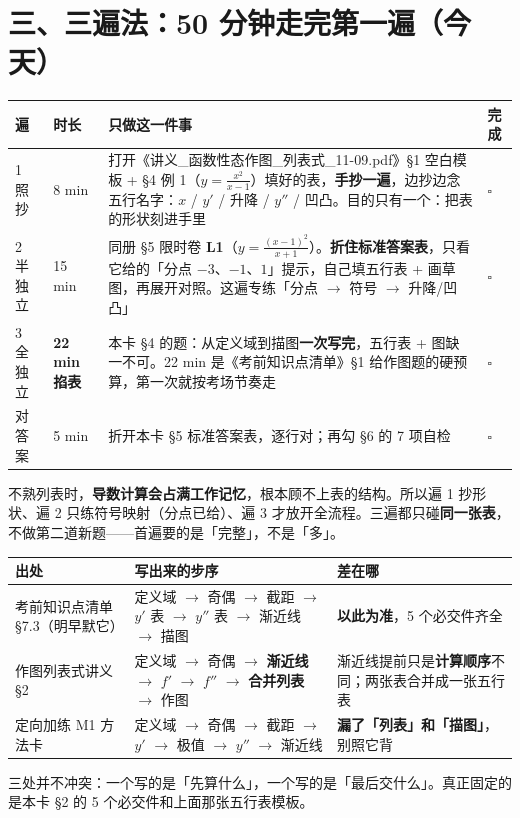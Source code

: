 \documentclass[11pt,a4paper]{ctexart}
\begin{document}
\section{三、三遍法：50 分钟走完第一遍（今天）}

\begin{center}\footnotesize
\begin{tabular}{@{}p{1.2cm}p{1.4cm}p{10.2cm}p{1.5cm}@{}}
\toprule
\textbf{遍} & \textbf{时长} & \textbf{只做这一件事} & \textbf{完成} \\
\midrule
1 照抄 & 8 min & 打开《讲义\_函数性态作图\_列表式\_11-09.pdf》§1 空白模板 + §4 例 1（$y=\frac{x^2}{x-1}$）填好的表，\textbf{手抄一遍}，边抄边念五行名字：$x$ / $y'$ / 升降 / $y''$ / 凹凸。目的只有一个：把表的形状刻进手里 & $\square$ \\
2 半独立 & 15 min & 同册 §5 限时卷 \textbf{L1}（$y=\frac{(x-1)^2}{x+1}$）。\textbf{折住标准答案表}，只看它给的「分点 $-3$、$-1$、$1$」提示，自己填五行表 + 画草图，再展开对照。这遍专练「分点 $\to$ 符号 $\to$ 升降/凹凸」 & $\square$ \\
3 全独立 & \textbf{22 min 掐表} & 本卡 §4 的题：从定义域到描图\textbf{一次写完}，五行表 + 图缺一不可。22 min 是《考前知识点清单》§1 给作图题的硬预算，第一次就按考场节奏走 & $\square$ \\
对答案 & 5 min & 折开本卡 §5 标准答案表，逐行对；再勾 §6 的 7 项自检 & $\square$ \\
\bottomrule
\end{tabular}
\end{center}

\begin{keypoint}[为什么是这个顺序]
不熟列表时，\textbf{导数计算会占满工作记忆}，根本顾不上表的结构。所以遍 1 抄形状、遍 2 只练符号映射（分点已给）、遍 3 才放开全流程。三遍都只碰\textbf{同一张表}，不做第二道新题——首遍要的是「完整」，不是「多」。
\end{keypoint}

\vspace{4pt}
\begin{keypoint}
\begin{tabular}{@{}p{3.2cm}p{6.8cm}p{4.4cm}@{}}
\textbf{出处} & \textbf{写出来的步序} & \textbf{差在哪} \\
\hline
考前知识点清单 §7.3（明早默它） & 定义域 $\to$ 奇偶 $\to$ 截距 $\to$ $y'$ 表 $\to$ $y''$ 表 $\to$ 渐近线 $\to$ 描图 & \textbf{以此为准}，5 个必交件齐全 \\
作图列表式讲义 §2 & 定义域 $\to$ 奇偶 $\to$ \textbf{渐近线} $\to$ $f'$ $\to$ $f''$ $\to$ \textbf{合并列表} $\to$ 作图 & 渐近线提前只是\textbf{计算顺序}不同；两张表合并成一张五行表 \\
定向加练 M1 方法卡 & 定义域 $\to$ 奇偶 $\to$ 截距 $\to$ $y'$ $\to$ 极值 $\to$ $y''$ $\to$ 渐近线 & \textbf{漏了「列表」和「描图」}，别照它背 \\
\end{tabular}
\par\vspace{3pt}
{\footnotesize 三处并不冲突：一个写的是「先算什么」，一个写的是「最后交什么」。真正固定的是本卡 §2 的 5 个必交件和上面那张五行表模板。}
\end{keypoint}
\end{document}
